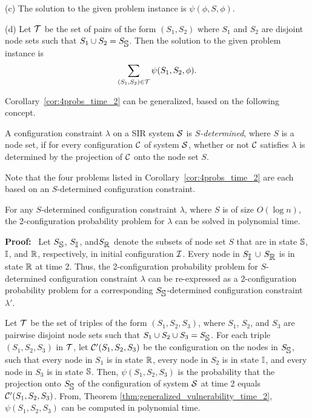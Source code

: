 (c)
The solution to the given \TwoVuls{} problem instance is $\psi(\phi, S, \phi)$.

(d)
Let $\cal T$ be the set of pairs of the form $(S_1, S_2)$
where $S_1$ and $S_2$ are disjoint node sets such that
$S_1 \cup S_2 = S_{\mbox{$\mathbb{S}$}}$.
Then the solution to the given \TwoTotVuls{} problem instance is 
\[
\sum_{(S_1, S_2) \in {\cal T} } \psi(S_1, S_2, \phi).
\]
\QED

Corollary~\ref{cor:4probs_time_2} can be generalized, based on the following concept.

\begin{definition}\label{def:S_determined}
A configuration constraint $\lambda$ on a SIR system $\mbox{${\cal S}$}{}$ is 
{\em $S$-determined}, where $S$ is  a node set, if 
for every configuration $\mbox{${\cal C}$}{}$ of system $\mbox{${\cal S}$}{}$,
whether or not $\mbox{${\cal C}$}{}$ satisfies $\lambda$ 
is determined by the projection of $\mbox{${\cal C}$}{}$ onto the node set $S$.
\end{definition}

Note that the four problems listed in Corollary~\ref{cor:4probs_time_2} 
are each based on an $S$-determined configuration constraint.

\begin{corollary}\label{cor:S_determined_time_2}
For any $S$-determined configuration constraint $\lambda$,
where $S$ is of size $O(\log{n})$,
the 2-configuration probability problem for $\lambda$
can be solved in polynomial time.
\end{corollary}
\textbf{Proof:}~  
Let $S_{\mbox{$\mathbb{S}$}}$, $S_{\mbox{$\mathbb{I}$}}$, and$S_{\mbox{$\mathbb{R}$}}$ denote the subsets of node set $S$ 
that are in state $\mbox{$\mathbb{S}$}$,   $\mbox{$\mathbb{I}$}$, and  $\mbox{$\mathbb{R}$}$, respectively,
in initial configuration $\mbox{${\cal I}$}{}$. 
Every node in $S_{\mbox{$\mathbb{I}$}}\,\cup\,S_{\mbox{$\mathbb{R}$}}$ is in state $\mbox{$\mathbb{R}$}$ at time 2.
Thus, the 2-configuration probability problem for $S$-determined 
configuration constraint $\lambda$
can be re-expressed as a 2-configuration probability problem 
for a corresponding $S_{\mbox{$\mathbb{S}$}}$-determined configuration constraint $\lambda'$.

Let $\cal T$ be the set of triples of the form $(S_1, S_2, S_3)$,
where $S_1$, $S_2$, and $S_3$ are pairwise disjoint node sets such that
$S_1 \cup S_2 \cup S_3 = S_{\mbox{$\mathbb{S}$}}$.
For each triple $(S_1, S_2, S_3)$ in $\cal T{}$,
let $\mbox{${\cal C}$}{}'(S_1, S_2, S_3)$ be the configuration on the nodes in $S_{\mbox{$\mathbb{S}$}}$,
such that every node in $S_1$ is in state ${\mbox{$\mathbb{R}$}}$,
every node in $S_2$ is in state ${\mbox{$\mathbb{I}$}}$,
and every node in $S_3$ is in state ${\mbox{$\mathbb{S}$}}$.
Then, $\psi(S_1, S_2, S_3)$ is the probability that 
the projection onto $S_{\mbox{$\mathbb{S}$}}$ of the configuration of system $\mbox{${\cal S}$}{}$ at time 2 
equals $\mbox{${\cal C}$}{}'(S_1, S_2, S_3)$.
From, Theorem \ref{thm:generalized_vulnerability_time_2},
$\psi(S_1, S_2, S_3)$ can be computed in polynomial time.

